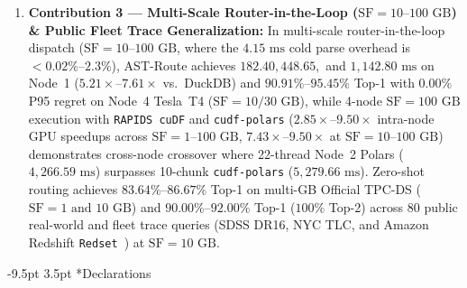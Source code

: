 \documentclass[10pt,a4paper]{article}
\makeatletter
\renewcommand\section{\@startsection{section}{1}{\z@}%
  {-9.5pt \@plus -2pt \@minus -1.5pt}%
  {3.5pt \@plus 1pt}%
  {\normalfont\large\bfseries}}
\makeatother
\begin{document}
\begin{enumerate}[leftmargin=1.5em,itemsep=1.5pt]
    \item \textbf{Contribution 3 --- Multi-Scale Router-in-the-Loop ($\text{SF}=10\text{--}100\text{ GB}$) \& Public Fleet Trace Generalization:} In multi-scale router-in-the-loop dispatch ($\text{SF}=10\text{--}100\text{ GB}$, where the $4.15\text{ ms}$ cold parse overhead is $<0.02\%\text{--}2.3\%$), AST-Route achieves $182.40, 448.65,$ and $1{,}142.80\text{ ms}$ on Node~1 ($5.21\times\text{--}7.61\times$ vs.\ DuckDB) and $90.91\%\text{--}95.45\%$ Top-1 with $0.00\%$ P95 regret on Node~4 Tesla~T4 ($\text{SF}=10/30\text{ GB}$), while 4-node $\text{SF}=100\text{ GB}$ execution with \texttt{RAPIDS cuDF} and \texttt{cudf-polars} ($2.85\times\text{--}9.50\times$ intra-node GPU speedups across $\text{SF}=1\text{--}100\text{ GB}$, $7.43\times\text{--}9.50\times$ at $\text{SF}=10\text{--}100\text{ GB}$) demonstrates cross-node crossover where 22-thread Node~2 Polars ($4{,}266.59\text{ ms}$) surpasses 10-chunk \texttt{cudf-polars} ($5{,}279.66\text{ ms}$). Zero-shot routing achieves $83.64\%\text{--}86.67\%$ Top-1 on multi-GB Official TPC-DS ($\text{SF}=1\text{ and }10\text{ GB}$) and $90.00\%\text{--}92.00\%$ Top-1 ($100\%$ Top-2) across $80$ public real-world and fleet trace queries (SDSS DR16, NYC TLC, and Amazon Redshift \texttt{Redset}~\cite{vanrenen2024redset}) at $\text{SF}=10\text{ GB}$.
\end{enumerate}

\section*{Declarations}
\enlargethispage{1.8\baselineskip}
\vspace{-5pt}
\end{document}
